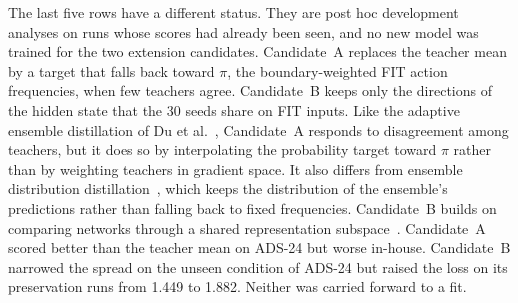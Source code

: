 The last five rows have a
different status. They are post hoc development analyses on runs whose
scores had already been seen, and no new model was trained for the two
extension candidates. Candidate~A replaces the teacher mean by a target
that falls back toward $\pi$, the boundary-weighted FIT action
frequencies, when few teachers agree.
Candidate~B keeps only the directions of the hidden state that the 30
seeds share on FIT inputs. Like the adaptive ensemble distillation of
Du et al.~\cite{du2020agree}, Candidate~A responds to disagreement among
teachers, but it does so by interpolating the probability target toward
$\pi$ rather than by weighting teachers in gradient space.
It also
differs from
ensemble distribution distillation~\cite{malinin2019ensemble}, which keeps the
distribution of the ensemble's predictions rather than falling back to
fixed frequencies.
Candidate~B builds on comparing networks through a shared
representation subspace~\cite{raghu2017svcca}.
Candidate~A scored better than the teacher mean on ADS-24
but worse in-house. Candidate~B narrowed the spread on the unseen
condition of ADS-24 but raised the loss on its preservation runs from 1.449 to
1.882. Neither was carried forward to a fit.


